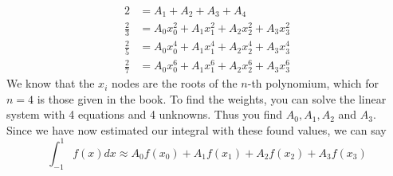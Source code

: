\documentclass[12pt]{article}
\begin{document}
\begin{align*}
2&=A_1+ A_2+A_3+A_4 \\
\frac{2}{3}&=A_0x_0^2+A_1x_1^2+A_2x_2^2+A_3x_3^2 \\
\frac{2}{5}&=A_0x_0^4+A_1x_1^4+A_2x_2^4+A_3x_3^4 \\
\frac{2}{7}&=A_0x_0^6+A_1x_1^6+A_2x_2^6+A_3x_3^6
\end{align*}
We know that the $x_i$ nodes are the roots of the $n$-th polynomium, which for $n=4$ is those given in the book. To find the weights, you can solve the linear system with 4 equations and 4 unknowns. Thus you find $A_0,A_1,A_2$ and $A_3$.\\
Since we have now estimated our integral with these found values, we can say
$$\int_{-1}^1f(x)dx\approx A_0f(x_0)+A_1f(x_1)+A_2f(x_2)+A_3f(x_3)$$
\end{document}

